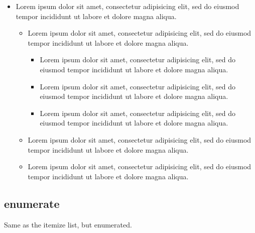 \begin{filecontents*}{\democodefile}
\begin{itemize}
   \item Lorem ipsum dolor sit amet, consectetur adipisicing elit, sed do
   eiusmod tempor incididunt ut labore et dolore magna aliqua.
   \begin{itemize}
      \item Lorem ipsum dolor sit amet, consectetur adipisicing elit, sed do
      eiusmod tempor incididunt ut labore et dolore magna aliqua.
      \begin{itemize}
         \item Lorem ipsum dolor sit amet, consectetur adipisicing elit, sed
         do eiusmod tempor incididunt ut labore et dolore magna aliqua.
         \item Lorem ipsum dolor sit amet, consectetur adipisicing elit, sed
         do eiusmod tempor incididunt ut labore et dolore magna aliqua.
         \item Lorem ipsum dolor sit amet, consectetur adipisicing elit, sed
         do eiusmod tempor incididunt ut labore et dolore magna aliqua.
      \end{itemize}
      \item Lorem ipsum dolor sit amet, consectetur adipisicing elit, sed do
      eiusmod tempor incididunt ut labore et dolore magna aliqua.
      \item Lorem ipsum dolor sit amet, consectetur adipisicing elit, sed do
      eiusmod tempor incididunt ut labore et dolore magna aliqua.
   \end{itemize}
\end{itemize}
\end{filecontents*}


\subsection{enumerate}

Same as the itemize list, but enumerated.

